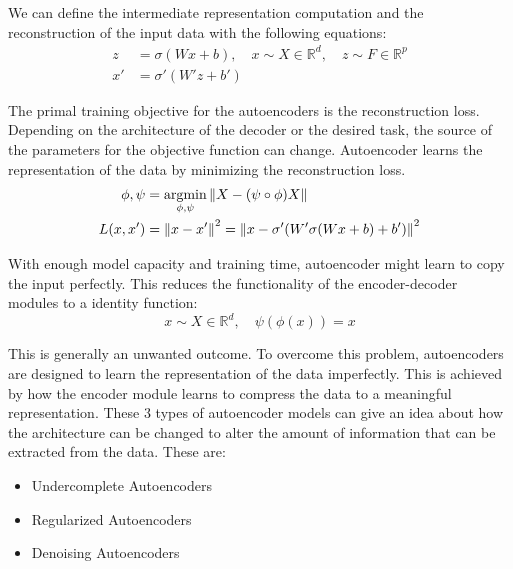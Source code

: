 We can define the intermediate representation computation and the reconstruction of the input data
with the following equations:
\begin{align}  
    z  &= \sigma( W x + b) ,\quad x \sim X \in \mathbb{R}^d ,\quad z \sim F \in \mathbb{R}^p \\
    x'  &= \sigma' (W' z + b') 
\end{align}

The primal training objective for the autoencoders is the reconstruction loss. Depending on the
architecture of the decoder or the desired task, the source of the parameters for the objective
function can change. Autoencoder learns the representation of the data by minimizing the
reconstruction loss. 
\begin{align}
    \label{eqn:ae_rec}
  \phi, \psi & = \underset{\phi, \psi}{\text{argmin}} \left\lVert X - (\psi \circ \phi) X\right\rVert \\  
  L(x, x') & = \left\lVert x - x'\right\rVert^2 = \left\lVert x - \sigma' (W' \sigma (W x + b) + b')\right\rVert^2
\end{align}

With enough model capacity and training time, autoencoder might learn to copy the input perfectly.
This reduces the functionality of the encoder-decoder modules to a identity function:
$$
 x \sim X \in \mathbb{R}^d, \quad \psi(\phi(x)) = x
$$

This is generally an unwanted outcome. To overcome this problem, autoencoders are designed to learn the
representation of the data imperfectly. \cite{Goodfellow-et-al-2016} This is achieved by how the
encoder module learns to compress the data to a meaningful representation. These 3 types of
autoencoder models can give an idea about how the architecture can be changed to alter the amount of
information that can be extracted from the data. These are:

\begin{itemize}
    \item Undercomplete Autoencoders
    \item Regularized Autoencoders
    \item Denoising Autoencoders
\end{itemize}

